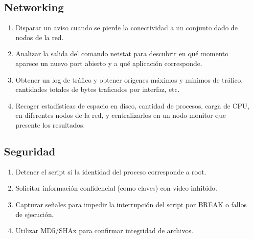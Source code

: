 \subsection{Networking}
\begin{enumerate}
	\item 
Disparar un aviso cuando se pierde la conectividad a un conjunto dado de nodos de la red.
	\item 
Analizar la salida del comando netstat para descubrir en qué momento aparece un nuevo port abierto y a qué aplicación corresponde.
	\item 
Obtener un log de tráfico y obtener orígenes máximos y mínimos de tráfico, cantidades totales de bytes traficados por interfaz, etc.
	\item 
Recoger estadísticas de espacio en disco, cantidad de procesos, carga de CPU, en diferentes nodos de la red, y centralizarlos en un nodo monitor que presente los resultados.
\end{enumerate}

\subsection{Seguridad}
\begin{enumerate}
	\item 
Detener el script si la identidad del proceso corresponde a root.
	\item 
Solicitar información confidencial (como claves) con video inhibido.
	\item 
Capturar señales para impedir la interrupción del script por BREAK o fallos de ejecución.
	\item 
Utilizar MD5/SHAx para confirmar integridad de archivos.
\end{enumerate}




